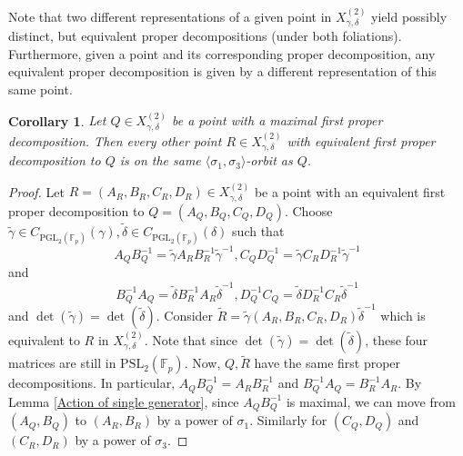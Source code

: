 \documentclass[letterpaper]{amsart}
\newtheorem{corollary}[theorem]{Corollary}
\begin{document}
Note that two different representations of a given point in $X^{(2)}_{\gamma,\delta}$ yield possibly distinct, but equivalent proper decompositions (under both foliations). Furthermore, given a point and its corresponding proper decomposition, any equivalent proper decomposition is given by a different representation of this same point.
\begin{corollary}
\label{Moving inside first foliation}
    Let $Q \in X^{(2)}_{\gamma,\delta}$ be a point with a maximal first proper decomposition. Then every other point $R \in X^{(2)}_{\gamma,\delta}$ with equivalent first proper decomposition to $Q$ is on the same $\langle\sigma_1,\sigma_3\rangle$-orbit as $Q$.
\end{corollary}
\begin{proof}
    Let $R = (A_R, B_R, C_R, D_R) \in X^{(2)}_{\gamma, \delta}$ be a point with an equivalent first proper decomposition to $Q = (A_Q, B_Q, C_Q, D_Q)$. Choose $\tilde{\gamma} \in C_{\mathrm{PGL}_2(\mathbb{F}_p)}(\gamma),\tilde{\delta} \in C_{\mathrm{PGL}_2(\mathbb{F}_p)}(\delta)$ such that $$A_QB_Q^{-1}=\tilde{\gamma}A_RB_R^{-1}\tilde{\gamma}^{-1},C_QD_Q^{-1}=\tilde{\gamma}C_RD_R^{-1}\tilde{\gamma}^{-1}$$ and $$B_Q^{-1}A_Q=\tilde{\delta}B_R^{-1}A_R\tilde{\delta}^{-1}, D_Q^{-1}C_Q=\tilde{\delta}D_R^{-1}C_R\tilde{\delta}^{-1}$$ and $\det(\tilde{\gamma}) = \det(\tilde{\delta})$. Consider $\tilde{R} = \tilde{\gamma}(A_R, B_R, C_R, D_R)\tilde{\delta}^{-1}$ which is equivalent to $R$ in $X^{(2)}_{\gamma,\delta}$. Note that since $\det(\tilde{\gamma})=\det(\tilde{\delta})$, these four matrices are still in $\mathrm{PSL}_2(\mathbb{F}_p)$.
    Now, $Q,\tilde{R}$ have the same first proper decompositions. In particular, $A_QB_Q^{-1} = A_RB_R^{-1}$ and $B_Q^{-1}A_Q = B_R^{-1}A_R$. By Lemma \ref{Action of single generator}, since $A_QB_Q^{-1}$ is maximal, we can move from $(A_Q,B_Q)$ to $(A_R, B_R)$ by a power of $\sigma_1$. Similarly for $(C_Q, D_Q)$ and $(C_R, D_R)$ by a power of $\sigma_3$.
\end{proof}
\end{document}
